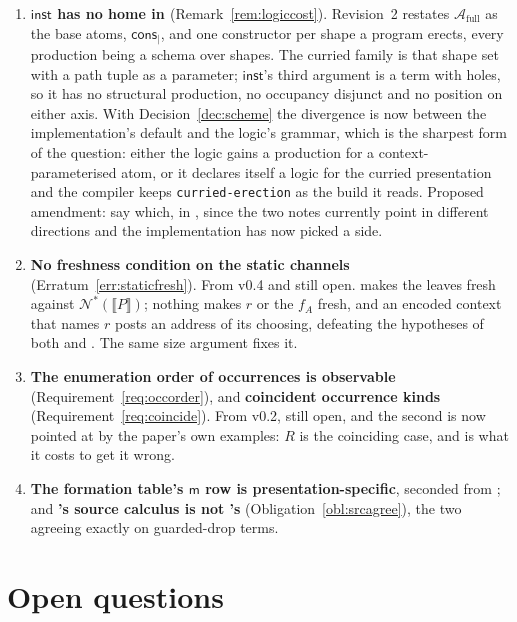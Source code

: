 \documentclass[11pt,a4paper]{article}
\newcommand{\code}[1]{\texttt{#1}}
\newcommand{\enc}[1]{\llbracket #1 \rrbracket}
\newcommand{\nms}[1]{\mathcal{N}^{*}(#1)}
\newcommand{\mm}{\mathsf{m}}
\newcommand{\cons}{\mathsf{cons}}
\newcommand{\Atm}{\mathcal{A}}
\newcommand{\inst}{\mathsf{inst}}
\theoremstyle{definition}
\theoremstyle{plain}
\begin{document}
\begin{enumerate}[leftmargin=1.8em]
\item \textbf{$\inst$ has no home in \cite{logic}} (Remark~\ref{rem:logiccost}).
Revision~2 restates
$\Atm_{\mathrm{full}}$ as the base atoms, $\cons_{\mid}$, and one constructor
per shape a program erects, every production being a schema over shapes. The
curried family is that shape set with a path tuple as a parameter; $\inst$'s
third argument is a term with holes, so it has no structural production, no
occupancy disjunct and no position on either axis. With
Decision~\ref{dec:scheme} the divergence is now between the implementation's
default and the logic's grammar, which is the sharpest form of the question:
either the logic gains a production for a context-parameterised atom, or it
declares itself a logic for the curried presentation and the compiler keeps
\code{curried-erection} as the build it reads. Proposed amendment: say which,
in \cite{logic}, since the two notes currently point in different directions
and the implementation has now picked a side.

\item \textbf{No freshness condition on the static channels}
(Erratum~\ref{err:staticfresh}). From v0.4 and still open.
\cite[Lem.~6.14]{draft3} makes the leaves fresh against $\nms{\enc{P}}$;
nothing makes $r$ or the $f_{A}$ fresh, and an encoded context that names $r$
posts an address of its choosing, defeating the hypotheses of both
\cite[Lem.~6.11]{draft3} and \cite[Lem.~6.14]{draft3}. The same size argument
fixes it.

\item \textbf{The enumeration order of occurrences is observable}
(Requirement~\ref{req:occorder}), and \textbf{coincident occurrence kinds}
(Requirement~\ref{req:coincide}). From v0.2, still open, and the second is now
pointed at by the paper's own examples: $R$ is the coinciding case, and
\cite[Ex.~6.21]{draft3} is what it costs to get it wrong.

\item \textbf{The formation table's $\mm$ row is presentation-specific},
seconded from \cite[Rem.~2.6]{logic}; and \textbf{\cite[\S2]{draft3}'s source
calculus is not \cite[Def.~2.6]{k1ndl1ng}'s}
(Obligation~\ref{obl:srcagree}), the two agreeing exactly on guarded-drop
terms.

\end{enumerate}

\section{Open questions}
\end{document}
